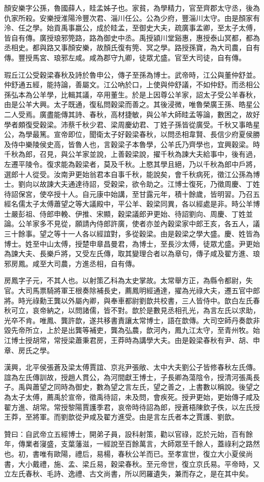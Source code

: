 \begin{pinyinscope}
顏安樂字公孫，魯國薛人，眭孟姊子也。家貧，為學精力，官至齊郡太守丞，後為仇家所殺。安樂授淮陽泠豐次君、淄川任公。公為少府，豐淄川太守。由是顏家有泠、任之學。始貢禹事嬴公，成於眭孟，至御史大夫，疏廣事孟卿，至太子太傅，皆自有傳。廣授琅邪筦路，路為御史中丞。禹授潁川堂谿惠，惠授泰山冥都，都為丞相史。都與路又事顏安樂，故顏氏復有筦、冥之學。路授孫寶，為大司農，自有傳。豐授馬宮、琅邪左咸。咸為郡守九卿，徒眾尤盛。官至大司徒，自有傳。

瑕丘江公受穀梁春秋及詩於魯申公，傳子至孫為博士。武帝時，江公與董仲舒並。仲舒通五經，能持論，善屬文。江公吶於口，上使與仲舒議，不如仲舒。而丞相公孫弘本為公羊學，比輯其議，卒用董生。於是上因尊公羊家，詔太子受公羊春秋，由是公羊大興。太子既通，復私問穀梁而善之。其後浸微，唯魯榮廣王孫、皓星公二人受焉。廣盡能傳其詩、春秋，高材捷敏，與公羊大師眭孟等論，數困之，故好學者頗復受穀梁。沛蔡千秋少君、梁周慶幼君、丁姓子孫皆從廣受。千秋又事皓星公，為學最篤。宣帝即位，聞衛太子好穀梁春秋，以問丞相韋賢、長信少府夏侯勝及侍中樂陵侯史高，皆魯人也，言穀梁子本魯學，公羊氏乃齊學也，宜興穀梁。時千秋為郎，召見，與公羊家並說，上善穀梁說，擢千秋為諫大夫給事中，後有過，左遷平陵令。復求能為穀梁者，莫及千秋。上愍其學且絕，乃以千秋為郎中戶將，選郎十人從受。汝南尹更始翁君本自事千秋，能說矣，會千秋病死，徵江公孫為博士。劉向以故諫大夫通達待詔，受穀梁，欲令助之。江博士復死，乃徵周慶、丁姓待詔保宮，使卒授十人。自元康中始講，至甘露元年，積十餘歲，皆明習。乃召五經名儒太子太傅蕭望之等大議殿中，平公羊、穀梁同異，各以經處是非。時公羊博士嚴彭祖、侍郎申輓、伊推、宋顯，穀梁議郎尹更始、待詔劉向、周慶、丁姓並論。公羊家多不見從，願請內侍郎許廣，使者亦並內穀梁家中郎王亥，各五人，議三十餘事。望之等十一人各以經誼對，多從穀梁。由是穀梁之學大盛。慶、姓皆為博士。姓至中山太傅，授楚申章昌曼君，為博士，至長沙太傅，徒眾尤盛。尹更始為諫大夫、長樂戶將，又受左氏傳，取其變理合者以為章句，傳子咸及翟方進、琅邪房鳳。咸至大司農，方進丞相，自有傳。

房鳳字子元，不其人也。以射策乙科為太史掌故。太常舉方正，為縣令都尉，失官。大司馬票騎將軍王根奏除補長史，薦鳳明經通達，擢為光祿大夫，遷五官中郎將。時光祿勳王龔以外屬內卿，與奉車都尉劉歆共校書，三人皆侍中。歆白左氏春秋可立，哀帝納之，以問諸儒，皆不對。歆於是數見丞相孔光，為言左氏以求助，光卒不肯。唯鳳、龔許歆，遂共移書責讓太常博士，語在歆傳。大司空師丹奏歆非毀先帝所立，上於是出龔等補吏，龔為弘農，歆河內，鳳九江太守，至青州牧。始江博士授胡常，常授梁蕭秉君房，王莽時為講學大夫。由是穀梁春秋有尹、胡、申章、房氏之學。

漢興，北平侯張蒼及梁太傅賈誼、京兆尹張敞、太中大夫劉公子皆修春秋左氏傳。誼為左氏傳訓故，授趙人貫公，為河間獻王博士，子長卿為蕩陰令，授清河張禹長子。禹與蕭望之同時為御史，數為望之言左氏，望之善之，上書數以稱說。後望之為太子太傅，薦禹於宣帝，徵禹待詔，未及問，會疾死。授尹更始，更始傳子咸及翟方進、胡常。常授黎陽賈護季君，哀帝時待詔為郎，授蒼梧陳欽子佚，以左氏授王莽，至將軍。而劉歆從尹咸及翟方進受。由是言左氏者本之賈護、劉歆。

贊曰：自武帝立五經博士，開弟子員，設科射策，勸以官祿，訖於元始，百有餘年，傳業者寖盛，支葉藩滋，一經說至百餘萬言，大師眾至千餘人，蓋祿利之路然也。初，書唯有歐陽，禮后，易楊，春秋公羊而已。至孝宣世，復立大小夏侯尚書，大小戴禮，施、孟、梁丘易，穀梁春秋。至元帝世，復立京氏易。平帝時，又立左氏春秋、毛詩、逸禮、古文尚書，所以罔羅遺失，兼而存之，是在其中矣。


\end{pinyinscope}